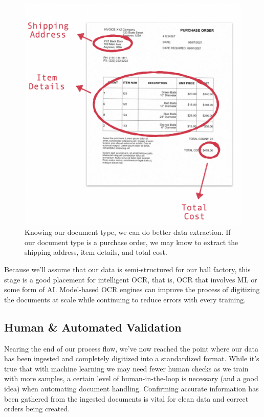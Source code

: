 \documentclass[conference]{IEEEtran}
\begin{document}
\begin{figure}[ht]
\centerline{\includegraphics[width=\columnwidth]{BetterDataExtraction.png}}
\caption{Knowing our document type, we can do better data extraction. If our document type is a purchase order, we may know to extract the shipping address, item details, and total cost.}
\label{figBetterDataExtraction}
\end{figure}

Because we'll assume that our data is semi-structured for our ball factory, this stage is a good placement for intelligent OCR, that is, OCR that involves ML or some form of AI. Model-based OCR engines can improve the process of digitizing the documents at scale while continuing to reduce errors with every training.

\subsection{Human \& Automated Validation}
Nearing the end of our process flow, we've now reached the point where our data has been ingested and completely digitized into a standardized format. While it's true that with machine learning we may need fewer human checks as we train with more samples, a certain level of human-in-the-loop is necessary (and a good idea) when automating document handling. Confirming accurate information has been gathered from the ingested documents is vital for clean data and correct orders being created.
\end{document}
